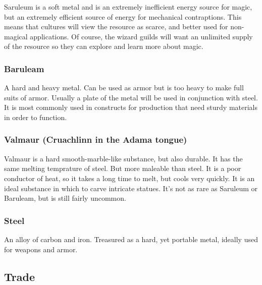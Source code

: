 \documentclass[11pt]{article}
\begin{document}
Saruleum is a soft metal and is an extremely inefficient energy source for magic, but an extremely efficient source of energy for mechanical contraptions. This means that cultures will view the resource as scarce, and better used for non-magical applications. Of course, the wizard guilds will want an unlimited supply of the resource so they can explore and learn more about magic.

\subsubsection{Baruleam}
\label{sec:org105d576}
A hard and heavy metal. Can be used as armor but is too heavy to make full suits of armor. Usually a plate of the metal will be used in conjunction with steel. It is most commonly used in constructs for production that need sturdy materials in order to function.

\subsubsection{Valmaur (Cruachlinn in the Adama tongue)}
\label{sec:org7660870}
Valmaur is a hard smooth-marble-like substance, but also durable. It has the same melting temprature of steel. But more maleable than steel. It is a poor conductor of heat, so it takes a long time to melt, but cools very quickly. It is an ideal substance in which to carve intricate statues. It's not as rare as Saruleum or Baruleam, but is still fairly uncommon.

\subsubsection{Steel}
\label{sec:org9525f79}
An alloy of carbon and iron. Treasured as a hard, yet portable metal, ideally used for weapons and armor.

\subsection{Trade}
\label{sec:orgf343190}
\end{document}
